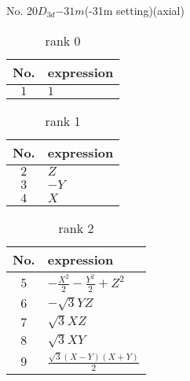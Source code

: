 \documentclass[fleqn,8pt,landscape]{jsarticle}
\begin{document}
\setcounter{MaxMatrixCols}{16}

\begin{center}
\LARGE
No. 20\quad$D_{3d}$\quad$-31m$\quad(-31m setting)\quad[ trigonal ] (axial)
\end{center}
\begin{table}[ht!]
\begin{center}
\caption{rank 0}
\renewcommand{\arraystretch}{1.3}
\begin{tabular}{cl} \hline \hline
No. & expression \\ \hline
$ 1 $ & $ 1 $ \\
 \hline \hline
\end{tabular}
\end{center}
\end{table}
\begin{table}[ht!]
\begin{center}
\caption{rank 1}
\renewcommand{\arraystretch}{1.3}
\begin{tabular}{cl} \hline \hline
No. & expression \\ \hline
$ 2 $ & $ Z $ \\
$ 3 $ & $ - Y $ \\
$ 4 $ & $ X $ \\
 \hline \hline
\end{tabular}
\end{center}
\end{table}
\begin{table}[ht!]
\begin{center}
\caption{rank 2}
\renewcommand{\arraystretch}{1.3}
\begin{tabular}{cl} \hline \hline
No. & expression \\ \hline
$ 5 $ & $ - \frac{X^{2}}{2} - \frac{Y^{2}}{2} + Z^{2} $ \\
$ 6 $ & $ - \sqrt{3} Y Z $ \\
$ 7 $ & $ \sqrt{3} X Z $ \\
$ 8 $ & $ \sqrt{3} X Y $ \\
$ 9 $ & $ \frac{\sqrt{3} \left(X - Y\right) \left(X + Y\right)}{2} $ \\
 \hline \hline
\end{tabular}
\end{center}
\end{table}
\end{document}
